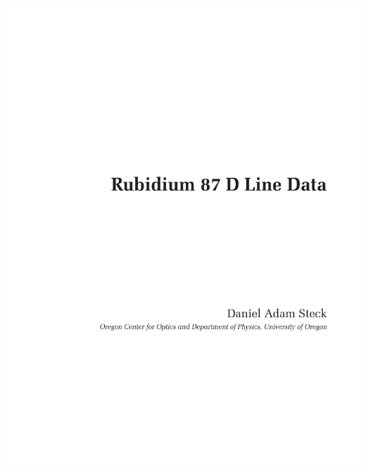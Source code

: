 \documentclass[a4paper, parskip=half, 12pt, bibliography=totocnumbered]{scrartcl}
\begin{document}
\begin{addmargin}[-2em]{2em}
\includegraphics[page=25, trim=2cm 3cm 2cm 35mm, clip]{literature/rubidium87numbers.pdf}
\end{addmargin}
\end{document}
